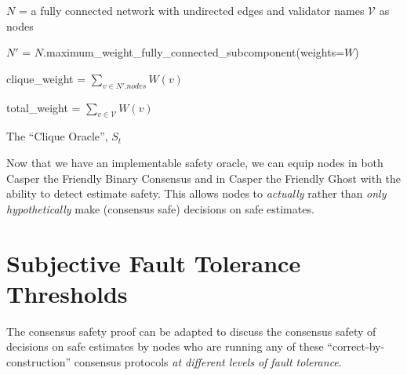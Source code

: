 \documentclass{article}
\theoremstyle{definition}
\begin{document}
\begin{algorithm}[H]



  $N$ = a fully connected network with undirected edges and validator names $\mathcal{V}$ as nodes


  $N'$ = $N$.maximum\_weight\_fully\_connected\_subcomponent(weights=$W$)

  clique\_weight = $\sum_{v \in N'.nodes} W(v)$

  total\_weight = $\sum_{v \in \mathcal{V}} W(v)$



\caption{The ``Clique Oracle'', $S_t$}
\end{algorithm}

Now that we have an implementable safety oracle, we can equip nodes in both Casper the Friendly Binary Consensus and in Casper the Friendly Ghost with the ability to detect estimate safety. This allows nodes to \emph{actually} rather than \emph{only hypothetically} make (consensus safe) decisions on safe estimates.


\section{Subjective Fault Tolerance Thresholds}

The consensus safety proof can be adapted to discuss the consensus safety of decisions on safe estimates by nodes who are running any of these ``correct-by-construction'' consensus protocols \emph{at different levels of fault tolerance}.
\end{document}

